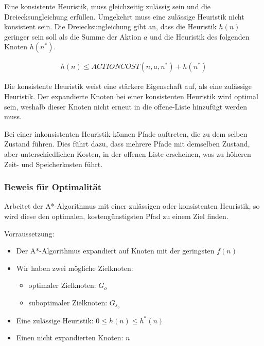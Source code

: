 Eine konsistente Heuristik, muss gleichzeitig zul\"{a}ssig sein und die Dreiecksungleichung erf\"{u}llen. Umgekehrt muss eine zul\"{a}ssige Heuristik nicht konsistent sein. Die Dreiecksungleichung gibt an, dass die Heuristik $h(n)$ geringer sein soll als die Summe der Aktion $a$ und die Heuristik des folgenden Knoten $h(n^*)$.


\begin{align}
	h(n) \leq \textit{ACTIONCOST}(n,a,n^*) + h(n^*)
\end{align}

Die konsistente Heuristik weist eine st\"{a}rkere Eigenschaft auf, als eine zul\"{a}ssige Heuristik. Der expandierte Knoten bei einer konsistenten Heuristik wird optimal sein, weshalb dieser Knoten nicht erneut in die offene-Liste hinzuf\"{u}gt werden muss.

Bei einer inkonsistenten Heuristik k\"{o}nnen Pfade auftreten, die zu dem selben Zustand f\"{u}hren. Dies f\"{u}hrt dazu, dass mehrere Pfade mit demselben Zustand, aber unterschiedlichen Kosten, in der offenen Liste erscheinen, was zu h\"{o}heren Zeit- und Speicherkosten f\"{u}hrt.

\subsubsection{Beweis f\"{u}r Optimalit\"{a}t}
\label{chap:a stern be}

Arbeitet der A*-Algorithmus mit einer zul\"{a}ssigen oder konsistenten Heuristik, so wird diese den optimalen, kosteng\"{u}nstigsten Pfad zu einem Ziel finden.

Vorraussetzung:
\begin{itemize}
\item Der A*-Algorithmus expandiert auf Knoten mit der geringsten $f(n)$
\item Wir haben zwei m\"{o}gliche Zielknoten:
\begin{itemize}
	\item optimaler Zielknoten: $G_o$
	\item suboptimaler Zielknoten: $G_s_o$
\end{itemize}
\item Eine zul\"{a}ssige Heuristik: $0 \leq h(n) \leq h^*(n)$
\item Einen nicht expandierten Knoten: $n$
\end{itemize}

